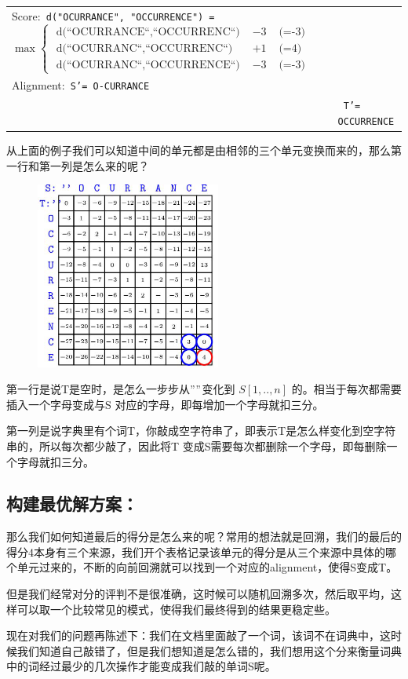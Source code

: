\newpage

\begin{tiny}
  \begin{table}
  \begin{tabular}{ll}
  Score:\texttt{ d("OCURRANCE", "OCCURRENCE") = } $  \max \left \{  \begin{array}{lll} \text{ d(``OCURRANCE``,``OCCURRENC``) } & -3  & \text{ (=-3) } \\
\text{ d(``OCURRANC``,``OCCURRENC``) }      & +1  & \text{ (=4) } \\
\text{ d(``OCURRANC``,``OCCURRENCE``) }   &  -3 & \text{ (=-3) } \end{array} \right.  $       \\
    Alignment:\texttt{  S'=  O-CURRANCE } \\
   		     &\texttt{ T'=  OCCURRENCE } \\
  \end{tabular}
  \end{table}
  \end{tiny}

从上面的例子我们可以知道中间的单元都是由相邻的三个单元变换而来的，那么第一行和第一列是怎么来的呢？

\begin{figure}
	\centering
	\includegraphics[width=2.4in]{alignment25.png}
\end{figure}

 第一行是说T是空时，是怎么一步步从$""$变化到 $S[1,..,n]$ 的。相当于每次都需要插入一个字母变成与S 对应的字母，即每增加一个字母就扣三分。

 第一列是说字典里有个词T，你敲成空字符串了，即表示T是怎么样变化到空字符串的，所以每次都少敲了，因此将T 变成S需要每次都删除一个字母，即每删除一个字母就扣三分。


\newpage

\subsection{构建最优解方案：}

那么我们如何知道最后的得分是怎么来的呢？常用的想法就是回溯，我们的最后的得分4本身有三个来源，我们开个表格记录该单元的得分是从三个来源中具体的哪个单元过来的，不断的向前回溯就可以找到一个对应的alignment，使得S变成T。

但是我们经常对分的评判不是很准确，这时候可以随机回溯多次，然后取平均，这样可以取一个比较常见的模式，使得我们最终得到的结果更稳定些。


现在对我们的问题再陈述下：我们在文档里面敲了一个词，该词不在词典中，这时候我们知道自己敲错了，但是我们想知道是怎么错的，我们想用这个分来衡量词典中的词经过最少的几次操作才能变成我们敲的单词S呢。

